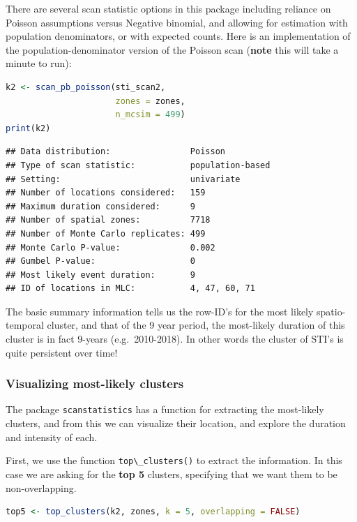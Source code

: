 \documentclass[
]{book}
\newcommand{\passthrough}[1]{#1}
\begin{document}
There are several scan statistic options in this package including reliance on Poisson assumptions versus Negative binomial, and allowing for estimation with population denominators, or with expected counts. Here is an implementation of the population-denominator version of the Poisson scan (\textbf{note} this will take a minute to run):

\begin{lstlisting}[language=R]
k2 <- scan_pb_poisson(sti_scan2, 
                      zones = zones,
                      n_mcsim = 499)
print(k2)
\end{lstlisting}

\begin{lstlisting}
## Data distribution:                Poisson
## Type of scan statistic:           population-based
## Setting:                          univariate
## Number of locations considered:   159
## Maximum duration considered:      9
## Number of spatial zones:          7718
## Number of Monte Carlo replicates: 499
## Monte Carlo P-value:              0.002
## Gumbel P-value:                   0
## Most likely event duration:       9
## ID of locations in MLC:           4, 47, 60, 71
\end{lstlisting}

The basic summary information tells us the row-ID's for the most likely spatio-temporal cluster, and that of the 9 year period, the most-likely duration of this cluster is in fact 9-years (e.g.~2010-2018). In other words the cluster of STI's is quite persistent over time!

\hypertarget{visualizing-most-likely-clusters}{%
\subsubsection{Visualizing most-likely clusters}\label{visualizing-most-likely-clusters}}

The package \passthrough{\lstinline!scanstatistics!} has a function for extracting the most-likely clusters, and from this we can visualize their location, and explore the duration and intensity of each.

First, we use the function \passthrough{\lstinline!top\_clusters()!} to extract the information. In this case we are asking for the \textbf{top 5} clusters, specifying that we want them to be non-overlapping.

\begin{lstlisting}[language=R]
top5 <- top_clusters(k2, zones, k = 5, overlapping = FALSE)
\end{lstlisting}
\end{document}
